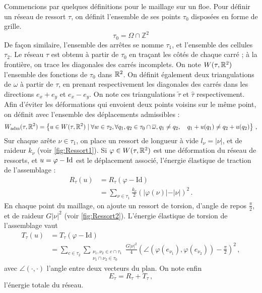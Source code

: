 Commencions par quelques définitions pour le maillage sur un floe. Pour définir un réseau de ressort $\tau$, on définit l'ensemble de ses points $\tau_0$ disposées en forme de grille. 
$$
\tau_0 = \Omega \cap \mathbb{Z}^2
$$
De façon similaire, l'ensemble des arrêtes se nomme $\tau_1$, et l'ensemble des cellules $\tau_2$. Le réseau $\tau$ est obtenu à partir de $\tau_0$ en traçant les côtés de chaque carré ; à la frontière, on trace les diagonales des carrés incomplets. On note $W (\tau, \mathbb{R}^2)$ l’ensemble des fonctions de $\tau_0$ dans $\mathbb{R}^2$. On définit également deux triangulations de $\omega$ à partir de $\tau$, en prenant respectivement les diagonales des carrés dans les directions $e_x + e_y$ et $e_x - e_y$. On note ces triangulations $\tilde{\tau}$ et $\hat{\tau}$ respectivement. 
Afin d'éviter les déformations qui envoient deux points voisins sur le même point, on définit avec l'ensemble des déplacements admissibles :
$$
W_{\text{\upshape adm}}(\tau, \mathbb{R}^2) =   \left\{ u\in W(\tau, \mathbb{R}^2) \mid \forall w \in \tau_2, \forall q_1, q_2 \in \tau_0 \cap \overline{\omega}, q_1 \neq q_2, \quad q_1 + u(q_1) \neq q_2 + u(q_2)  \right\} \,,
$$
Sur chaque arête $\nu \in \tau_1$, on place un ressort de longueur à vide $l_{\nu} = \vert \nu \vert$, et de raideur $k_{\nu}$ (voir \cref{fig:Ressort1}). Si $\varphi \in W (\tau, \mathbb{R}^2)$ est une déformation du réseau de ressorts, et $u = \varphi - \text{Id}$ est le déplacement associé, l’énergie élastique de traction de l’assemblage :
\begin{align*}
    R_{\tau}(u) &= R_{\tau}(\varphi - \text{Id}) \\
    &= \sum_{\nu \in \tau_1} \frac{k_{\nu}}{2} \left( \vert \varphi(\nu) \vert - \vert \nu \vert  \right)^2 \,.
\end{align*}
En chaque point du maillage, on ajoute un ressort de torsion, d'angle de repos $\frac{\pi}{2}$, et de raideur $G \vert \nu \vert^2$ (voir \cref{fig:Ressort2}). L’énergie élastique de torsion de l’assemblage vaut
\begin{align*}
    T_{\tau}(u) &= T_{\tau}(\varphi - \text{Id}) \\
    &= \sum_{c \in \tau_2} \sum_{\substack{\nu_1, \nu_2 \in c\cap\tau_1 \\ \nu_1 \cap \nu_2 \in \tau_0}} \frac{G \vert\nu \vert^2}{4} \left(  \angle(\varphi(e_{\nu_1}),\varphi(e_{\nu_2})) - \frac{\pi}{2}  \right)^2 \,,
\end{align*}
avec $\angle(\cdot,\cdot)$ l'angle entre deux vecteurs du plan. On note enfin
$$
E_{\tau} = R_{\tau} + T_{\tau} \,,
$$
l'énergie totale du réseau.

